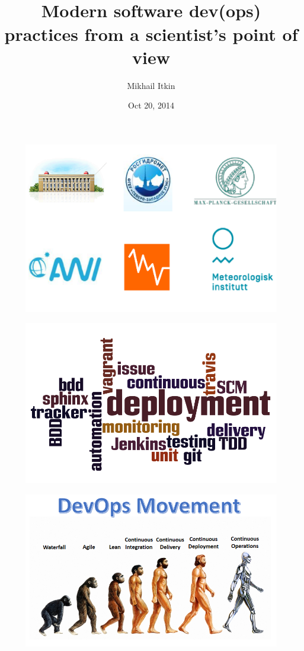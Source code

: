 \documentclass{beamer}
\title[Klækken, 20.-21.10.2014]{\\Modern software dev(ops) practices \newline from a scientist's point of view}
\author{Mikhail Itkin}
\institute{Istjenesten, VNN (Tromsø)}
\date{Oct 20, 2014}
\begin{document}
\begin{frame}
    \titlepage
\end{frame}

\begin{frame}
    \begin{figure}
        \includegraphics{img/whoami.png}
       \end{figure}
\end{frame}

\begin{frame}
    \begin{figure}
        \includegraphics[height=0.7\textheight]{img/wordcloud.png}
       \end{figure}
\end{frame}

\begin{frame}
    \begin{figure}
        \includegraphics[height=0.7\textheight]{img/devops2.png}
       \end{figure}
\end{frame}
\end{document}
